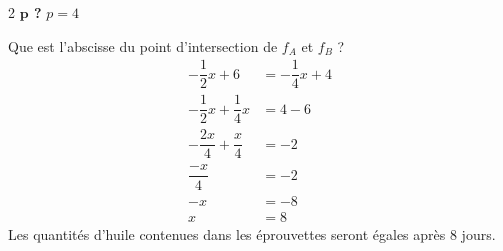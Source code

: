 \begin{enumerate}
\begin{multicols}{2}
                  \textbf{$\bm{p}$ ?}
                  \medbreak
                  $p=4$
              \end{multicols}
              Que est l'abscisse du point d'intersection de $f_A$ et $f_B$ ?
              \begin{align*}
                  -\dfrac{1}{2}x + 6             & = -\dfrac{1}{4}x + 4 \\
                  -\dfrac{1}{2}x + \dfrac{1}{4}x & = 4 - 6              \\
                  -\dfrac{2x}{4} + \dfrac{x}{4}  & = -2                 \\
                  \dfrac{-x}{4}                  & = -2                 \\
                  -x                             & = -8                 \\
                  x                              & = 8
              \end{align*}
              Les quantités d'huile contenues dans les éprouvettes seront égales après 8 jours.
    \end{enumerate}
